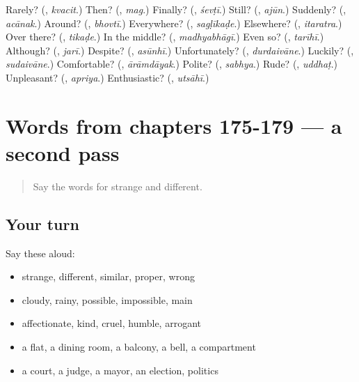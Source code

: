 \begin{tcolorbox}[breakable,colback=teal!4,colframe=teal!35!black,title={Before you move on}]
Rarely? (\textbf{}, \emph{kvacit}.) Then? (\textbf{}, \emph{mag}.) Finally? (\textbf{}, \emph{śevṭī}.) Still? (\textbf{}, \emph{ajūn}.) Suddenly? (\textbf{}, \emph{acānak}.) Around? (\textbf{}, \emph{bhovtī}.) Everywhere? (\textbf{}, \emph{sagḷīkaḍe}.) Elsewhere? (\textbf{}, \emph{itaratra}.) Over there? (\textbf{}, \emph{tikaḍe}.) In the middle? (\textbf{}, \emph{madhyabhāgī}.) Even so? (\textbf{}, \emph{tarīhī}.) Although? (\textbf{}, \emph{jarī}.) Despite? (\textbf{}, \emph{asūnhī}.) Unfortunately? (\textbf{}, \emph{durdaivāne}.) Luckily? (\textbf{}, \emph{sudaivāne}.) Comfortable? (\textbf{}, \emph{ārāmdāyak}.) Polite? (\textbf{}, \emph{sabhya}.) Rude? (\textbf{}, \emph{uddhaṭ}.) Unpleasant? (\textbf{}, \emph{apriya}.) Enthusiastic? (\textbf{}, \emph{utsāhī}.)
\end{tcolorbox}
\section[(dialogue)]{Words from chapters 175-179 — a second pass}

\label{lesson:MR-R179-second-pass-words-from-chapters-175-179}



\begin{quote}
Say the words for strange and different.
\end{quote}

\subsection*{Your turn}
Say these aloud:

\begin{itemize}
\raggedright
  \item strange, different, similar, proper, wrong
  \item cloudy, rainy, possible, impossible, main
  \item affectionate, kind, cruel, humble, arrogant
  \item a flat, a dining room, a balcony, a bell, a compartment
  \item a court, a judge, a mayor, an election, politics
\end{itemize}


